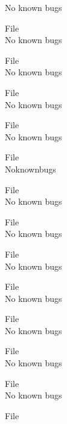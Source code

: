 \begin{DoxyRefList}
\label{bug__bug000018}%
%
No known bugs  
\item[File \doxylink{hgibbs_8cpp}{hgibbs.cpp} ]\hfill \\
\label{bug__bug000061}%
%
No known bugs  
\item[File \doxylink{hgibbs_8h}{hgibbs.h} ]\hfill \\
\label{bug__bug000019}%
%
No known bugs  
\item[File \doxylink{IERS_8cpp}{IERS.cpp} ]\hfill \\
\label{bug__bug000062}%
%
No known bugs  
\item[File \doxylink{IERS_8h}{IERS.h} ]\hfill \\
\label{bug__bug000020}%
%
No known bugs  
\item[File \doxylink{JPL__Eph__DE430_8cpp}{JPL\+\_\+\+Eph\+\_\+\+DE430.cpp} ]\hfill \\
\label{bug__bug000063}%
%
Noknownbugs  
\item[File \doxylink{JPL__Eph__DE430_8h}{JPL\+\_\+\+Eph\+\_\+\+DE430.h} ]\hfill \\
\label{bug__bug000021}%
%
No known bugs  
\item[File \doxylink{Legendre_8cpp}{Legendre.cpp} ]\hfill \\
\label{bug__bug000064}%
%
No known bugs  
\item[File \doxylink{Legendre_8h}{Legendre.h} ]\hfill \\
\label{bug__bug000022}%
%
No known bugs  
\item[File \doxylink{LTC_8cpp}{LTC.cpp} ]\hfill \\
\label{bug__bug000065}%
%
No known bugs  
\item[File \doxylink{LTC_8h}{LTC.h} ]\hfill \\
\label{bug__bug000023}%
%
No known bugs  
\item[File \doxylink{matrix_8cpp}{matrix.cpp} ]\hfill \\
\label{bug__bug000066}%
%
No known bugs  
\item[File \doxylink{matrix_8h}{matrix.h} ]\hfill \\
\label{bug__bug000024}%
%
No known bugs  
\item[File \doxylink{MeanObliquity_8cpp}{Mean\+Obliquity.cpp} ]\hfill \\

\end{DoxyRefList}
